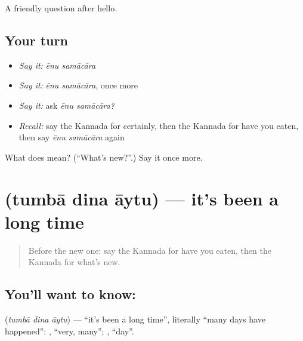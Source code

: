 \begin{grammarlens}[title={What you've built}]
A friendly question after hello.
\end{grammarlens}

\subsection*{Your turn}
\begin{itemize}
\raggedright
  \item \emph{Say it:} \emph{ēnu samācāra}
  \item \emph{Say it:} \emph{ēnu samācāra}, once more
  \item \emph{Say it:} ask \emph{ēnu samācāra?}
  \item \emph{Recall:} say the Kannada for certainly, then the Kannada for have you eaten, then say \emph{ēnu samācāra} again
\end{itemize}

\begin{tcolorbox}[breakable,colback=teal!4,colframe=teal!35!black,title={Before you move on}]
What does   mean? (\textquotedblleft{}What's new?\textquotedblright{}.) Say it once more.
\end{tcolorbox}
\section[\texorpdfstring{\kn{ತುಂಬಾ} \kn{ದಿನ} \kn{ಆಯ್ತು} (tumbā dina āytu)}{ತುಂಬಾ ದಿನ ಆಯ್ತು (tumbā dina āytu)}]{   (tumbā dina āytu) — it's been a long time}

\label{lesson:KA-C96-longtime}



\begin{quote}
Before the new one: say the Kannada for have you eaten, then the Kannada for what's new.
\end{quote}

\subsection*{You'll want to know:   }
\textbf{  } (\emph{tumbā dina āytu}) — \textquotedblleft{}it's been a long time\textquotedblright{}, literally \textquotedblleft{}many days have happened\textquotedblright{}: \textbf{}, \textquotedblleft{}very, many\textquotedblright{}; \textbf{}, \textquotedblleft{}day\textquotedblright{}.

